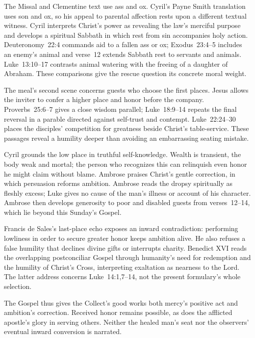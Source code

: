 The Missal and Clementine text use ass and ox. Cyril's Payne Smith translation uses son and ox, so his appeal to parental affection rests upon a different textual witness. Cyril interprets Christ's power as revealing the law's merciful purpose and develops a spiritual Sabbath in which rest from sin accompanies holy action. Deuteronomy~22:4 commands aid to a fallen ass or ox; Exodus~23:4--5 includes an enemy's animal and verse~12 extends Sabbath rest to servants and animals. Luke~13:10--17 contrasts animal watering with the freeing of a daughter of Abraham. These comparisons give the rescue question its concrete moral weight. 

The meal's second scene concerns guests who choose the first places. Jesus allows the inviter to confer a higher place and honor before the company. Proverbs~25:6--7 gives a close wisdom parallel; Luke~18:9--14 repeats the final reversal in a parable directed against self-trust and contempt. Luke~22:24--30 places the disciples' competition for greatness beside Christ's table-service. These passages reveal a humility deeper than avoiding an embarrassing seating mistake.

Cyril grounds the low place in truthful self-knowledge. Wealth is transient, the body weak and mortal; the person who recognizes this can relinquish even honor he might claim without blame. Ambrose praises Christ's gentle correction, in which persuasion reforms ambition. Ambrose reads the dropsy spiritually as fleshly excess; Luke gives no cause of the man's illness or account of his character. Ambrose then develops generosity to poor and disabled guests from verses~12--14, which lie beyond this Sunday's Gospel. 

Francis de Sales's last-place echo exposes an inward contradiction: performing lowliness in order to secure greater honor keeps ambition alive. He also refuses a false humility that declines divine gifts or interrupts charity. Benedict XVI reads the overlapping postconciliar Gospel through humanity's need for redemption and the humility of Christ's Cross, interpreting exaltation as nearness to the Lord. The latter address concerns Luke~14:1,7--14, not the present formulary's whole selection. 

The Gospel thus gives the Collect's good works both mercy's positive act and ambition's correction. Received honor remains possible, as does the afflicted apostle's glory in serving others. Neither the healed man's seat nor the observers' eventual inward conversion is narrated.

